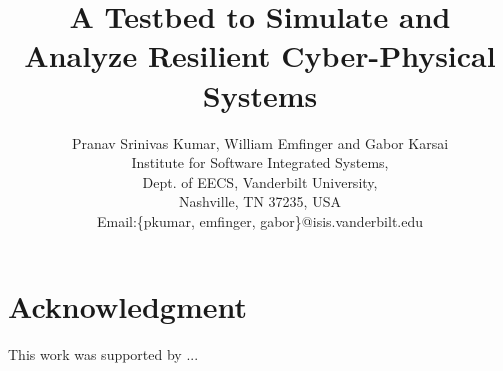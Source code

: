 \documentclass[conference]{IEEEtran}
\begin{document}
%
\title{A Testbed to Simulate and Analyze Resilient Cyber-Physical Systems}


\author{ Pranav Srinivas Kumar, William Emfinger and Gabor Karsai \\
Institute for Software Integrated Systems,\\ Dept. of EECS, Vanderbilt University,\\
Nashville, TN 37235, USA \\
Email:\{pkumar, emfinger, gabor\}@isis.vanderbilt.edu}


\maketitle








\section*{Acknowledgment}

This work was supported by ... 


%
\end{document}
